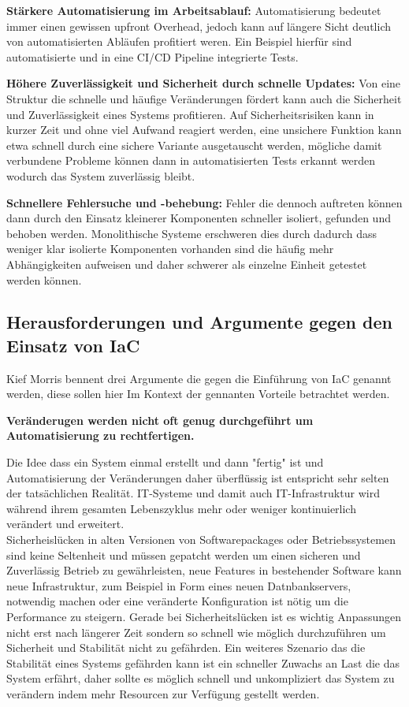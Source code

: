 \begin{spacing}{1.2}
\textbf{Stärkere Automatisierung im Arbeitsablauf:} Automatisierung
bedeutet immer einen gewissen upfront Overhead, jedoch kann auf
längere Sicht deutlich von automatisierten Abläufen profitiert weren.
Ein Beispiel hierfür sind automatisierte und in eine CI/CD Pipeline
integrierte Tests.

\textbf{Höhere Zuverlässigkeit und Sicherheit durch schnelle Updates:}
Von eine Struktur die schnelle und häufige Veränderungen fördert
kann auch die Sicherheit und Zuverlässigkeit eines Systems profitieren.
Auf Sicherheitsrisiken kann in kurzer Zeit und ohne viel Aufwand
reagiert werden, eine unsichere Funktion kann etwa schnell durch
eine sichere Variante ausgetauscht werden, mögliche damit verbundene
Probleme können dann in automatisierten Tests erkannt werden wodurch
das System zuverlässig bleibt.

\textbf{Schnellere Fehlersuche und -behebung:} Fehler die dennoch auftreten können dann durch den Einsatz kleinerer
Komponenten schneller isoliert, gefunden und behoben werden.
Monolithische Systeme erschweren dies durch dadurch dass weniger klar
isolierte Komponenten vorhanden sind die häufig mehr Abhängigkeiten
aufweisen und daher schwerer als einzelne Einheit getestet werden können.

\subsection{Herausforderungen und Argumente gegen den Einsatz von IaC}

Kief Morris bennent drei Argumente die gegen die Einführung von IaC
genannt werden, diese sollen hier Im Kontext der gennanten Vorteile betrachtet
werden.

\textbf{Veränderugen werden nicht oft genug durchgeführt um
Automatisierung zu rechtfertigen.}

Die Idee dass ein System einmal erstellt und dann "fertig" ist und
Automatisierung der Veränderungen daher überflüssig ist 
entspricht sehr selten der tatsächlichen Realität.
IT-Systeme und damit auch IT-Infrastruktur wird während ihrem gesamten
Lebenszyklus mehr oder weniger kontinuierlich verändert und erweitert.\\
Sicherheislücken in alten Versionen von Softwarepackages oder
Betriebssystemen sind keine Seltenheit und müssen gepatcht werden um
einen sicheren und Zuverlässig Betrieb zu gewährleisten, neue Features
in bestehender Software kann neue Infrastruktur, zum Beispiel in Form eines
neuen Datnbankservers, notwendig machen oder eine veränderte Konfiguration
ist nötig um die Performance zu steigern. Gerade bei Sicherheitslücken
ist es wichtig Anpassungen nicht erst nach längerer Zeit sondern so
schnell wie möglich durchzuführen um Sicherheit und Stabilität nicht
zu gefährden. Ein weiteres Szenario das die Stabilität eines Systems
gefährden kann ist ein schneller Zuwachs an Last die das System erfährt,
daher sollte es möglich schnell und unkompliziert das System zu verändern
indem mehr Resourcen zur Verfügung gestellt werden.


\end{spacing}

